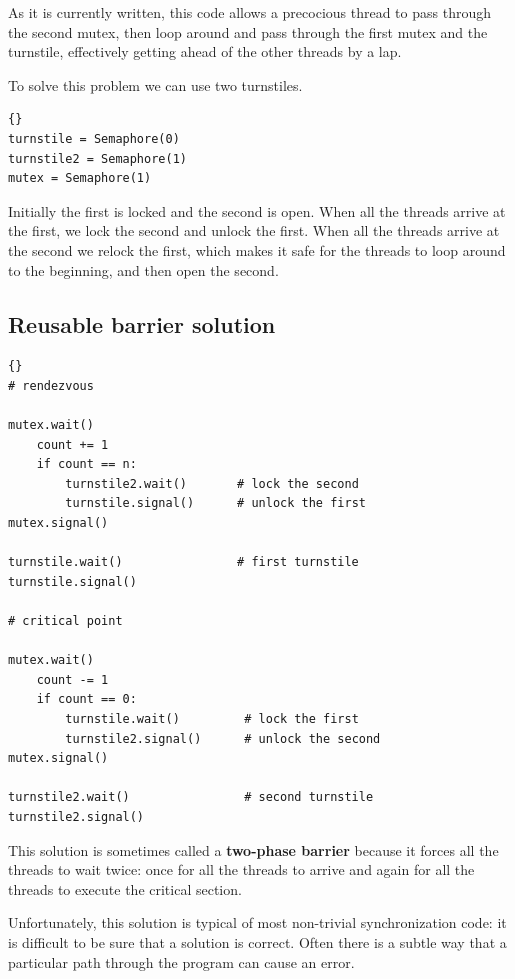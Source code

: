 \documentclass{book}
\newcommand{\clearemptydoublepage}{\newpage\cleardoublepage}
\begin{document}
As it is currently written, this code
allows a precocious thread to pass through the second mutex,
then loop around and pass through the first mutex and the
turnstile, effectively getting ahead of the other threads by
a lap.

To solve this problem we can use two turnstiles.

\begin{lstlisting}[caption={Reusable barrier hint}]{}
turnstile = Semaphore(0)
turnstile2 = Semaphore(1)
mutex = Semaphore(1)
\end{lstlisting}

Initially the first is locked and the second is open.  When all the
threads arrive at the first, we lock the second and unlock the first.
When all the threads arrive at the second we relock the first,
which makes it safe for the threads to loop around to the beginning,
and then open the second.



\clearemptydoublepage
\subsection {Reusable barrier solution}

\begin{lstlisting}[caption={Reusable barrier solution}]{}
# rendezvous

mutex.wait()
    count += 1
    if count == n:
        turnstile2.wait()       # lock the second
        turnstile.signal()      # unlock the first
mutex.signal()

turnstile.wait()                # first turnstile
turnstile.signal()

# critical point

mutex.wait()
    count -= 1
    if count == 0: 
        turnstile.wait()         # lock the first
        turnstile2.signal()      # unlock the second
mutex.signal()

turnstile2.wait()                # second turnstile
turnstile2.signal()
\end{lstlisting}

This solution is sometimes called a {\bf two-phase barrier} because
it forces all the threads to wait twice: once for all the threads
to arrive and again for all the threads to execute the critical
section.

Unfortunately, this solution is typical of most non-trivial
synchronization code: it is difficult to be sure that a solution is
correct.  Often there is a subtle way that a particular path through
the program can cause an error.
\end{document}
